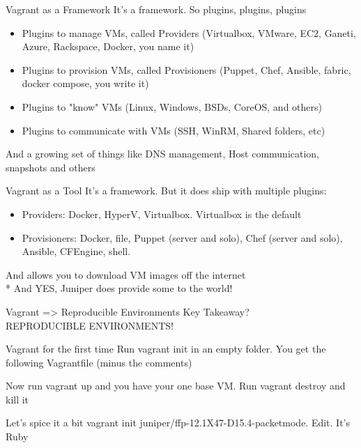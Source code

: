 \documentclass{beamer}
\begin{document}
    \begin{frame}{Vagrant as a Framework}
	    It's a framework. So plugins, plugins, plugins
        \begin{itemize}
		\pause \item Plugins to manage VMs, called Providers (Virtualbox, VMware, EC2, Ganeti, Azure, Rackspace, Docker, you name it)
		\pause \item Plugins to provision VMs, called Provisioners (Puppet, Chef, Ansible, fabric, docker compose, you write it)
		\pause \item Plugins to "know" VMs (Linux, Windows, BSDs, CoreOS, and others)
		\pause \item Plugins to communicate with VMs (SSH, WinRM, Shared folders, etc)
        \end{itemize}
	And a growing set of things like DNS management, Host communication, snapshots and others
    \end{frame}

    \begin{frame}{Vagrant as a Tool}
	    It's a framework. But it does ship with multiple plugins:
        \begin{itemize}
		\pause \item Providers: Docker, HyperV, Virtualbox. Virtualbox is the default
		\pause \item Provisioners: Docker, file, Puppet (server and solo), Chef (server and solo), Ansible, CFEngine, shell.
        \end{itemize}
	\pause And allows you to download VM images off the internet
	\pause \\* And YES, Juniper does provide some to the world!
    \end{frame}

    \begin{frame}{Vagrant => Reproducible Environments}
	    Key Takeaway?
	\pause \\ REPRODUCIBLE ENVIRONMENTS!
    \end{frame}

    \begin{frame}{Vagrant for the first time}
	    Run vagrant init in an empty folder. You get the following Vagrantfile (minus the comments)
	    
	    Now run vagrant up and you have your one base VM. Run vagrant destroy and kill it
    \end{frame}
    \begin{frame}{Let's spice it a bit}
	    vagrant init juniper/ffp-12.1X47-D15.4-packetmode. Edit. It's Ruby
	    
    \end{frame}
\end{document}
